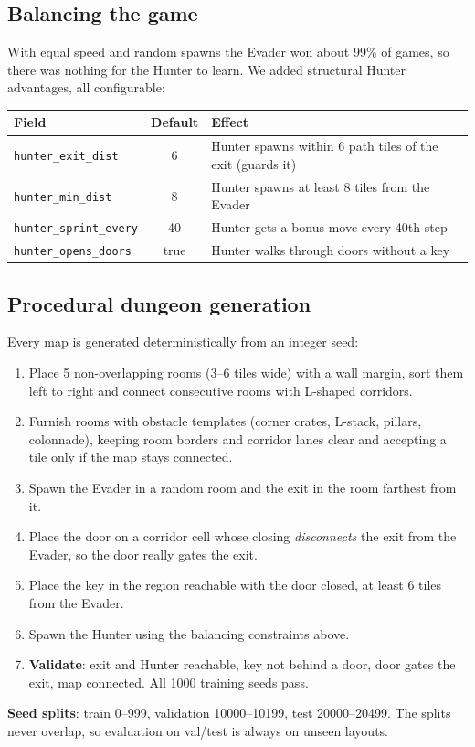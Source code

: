 \documentclass[11pt,a4paper]{article}
\newcommand{\code}[1]{\texttt{#1}}
\begin{document}
\subsection{Balancing the game}
With equal speed and random spawns the Evader won about 99\% of games, so there was nothing for the
Hunter to learn. We added structural Hunter advantages, all configurable:
\begin{center}
\begin{tabular}{lcl}
\toprule
\textbf{Field} & \textbf{Default} & \textbf{Effect}\\
\midrule
\code{hunter\_exit\_dist} & 6 & Hunter spawns within 6 path tiles of the exit (guards it)\\
\code{hunter\_min\_dist} & 8 & Hunter spawns at least 8 tiles from the Evader\\
\code{hunter\_sprint\_every} & 40 & Hunter gets a bonus move every 40th step\\
\code{hunter\_opens\_doors} & true & Hunter walks through doors without a key\\
\bottomrule
\end{tabular}
\end{center}

\subsection{Procedural dungeon generation}
Every map is generated deterministically from an integer seed:
\begin{enumerate}
  \item Place 5 non-overlapping rooms ($3$--$6$ tiles wide) with a wall margin, sort them left to
        right and connect consecutive rooms with L-shaped corridors.
  \item Furnish rooms with obstacle templates (corner crates, L-stack, pillars, colonnade), keeping
        room borders and corridor lanes clear and accepting a tile only if the map stays connected.
  \item Spawn the Evader in a random room and the exit in the room farthest from it.
  \item Place the door on a corridor cell whose closing \emph{disconnects} the exit from the Evader,
        so the door really gates the exit.
  \item Place the key in the region reachable with the door closed, at least 6 tiles from the Evader.
  \item Spawn the Hunter using the balancing constraints above.
  \item \textbf{Validate}: exit and Hunter reachable, key not behind a door, door gates the exit,
        map connected. All 1000 training seeds pass.
\end{enumerate}
\textbf{Seed splits}: train 0--999, validation 10000--10199, test 20000--20499. The splits never
overlap, so evaluation on val/test is always on unseen layouts.
\end{document}
